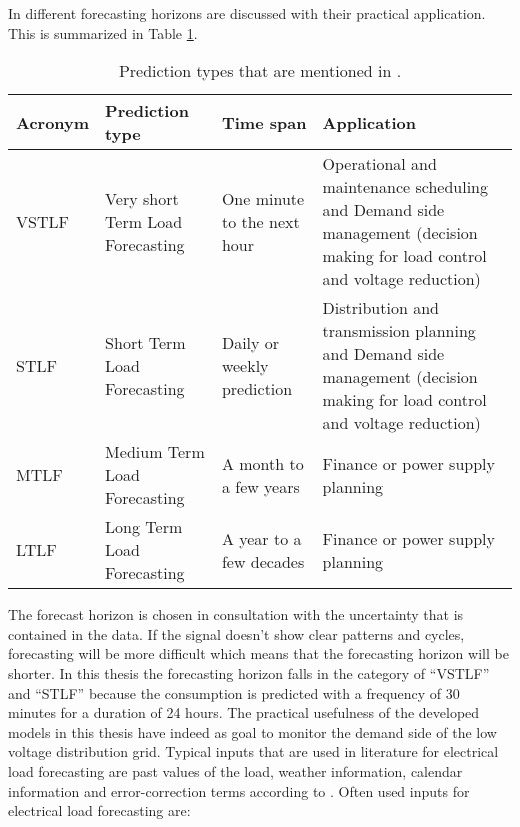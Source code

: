 In \cite{NarjesFallah2018} different forecasting horizons are discussed with their practical application. This is summarized in Table \ref{tab:prediciontypes}.

\begin{table}[h!]
	\centering
	\begin{tabular}{@{}lp{3cm}p{3cm}p{4.5cm}@{}} \toprule
		\textbf{Acronym}	& \textbf{Prediction type} & \textbf{Time span} & \textbf{Application}\\\midrule
		VSTLF	& Very short Term Load Forecasting	& One minute to the next hour	& Operational and maintenance
		scheduling and Demand side management
		(decision making for load
		control and voltage reduction)\\\hline		
		STLF	&	Short Term Load Forecasting 	& 	Daily or weekly prediction	& Distribution and transmission
		planning and Demand side management
		(decision making for load
		control and voltage reduction)\\\hline	
		MTLF	&	Medium Term Load Forecasting	& A month to a few years	& Finance or power supply planning\\\hline
		LTLF	&	Long Term Load Forecasting	&	A year to a few decades	&	Finance or power supply planning\\\bottomrule
	\end{tabular}
	\caption{Prediction types that are mentioned in \cite{NarjesFallah2018}.}
	\label{tab:prediciontypes}
\end{table}

The forecast horizon is chosen in consultation with the uncertainty that is contained in the data. If the signal doesn't show clear patterns and cycles, forecasting will be more difficult which means that the forecasting horizon will be shorter. In this thesis the forecasting horizon falls in the category of ``VSTLF'' and ``STLF'' because the consumption is predicted with a frequency of 30 minutes for a duration of 24 hours. The practical usefulness of the developed models in this thesis have indeed as goal to monitor the demand side of the low voltage distribution grid.
Typical inputs that are used in literature for electrical load forecasting are past values of the load, weather information, calendar information and error-correction terms according to \cite{loadforecastingmoor}. Often used inputs for electrical load forecasting are:

